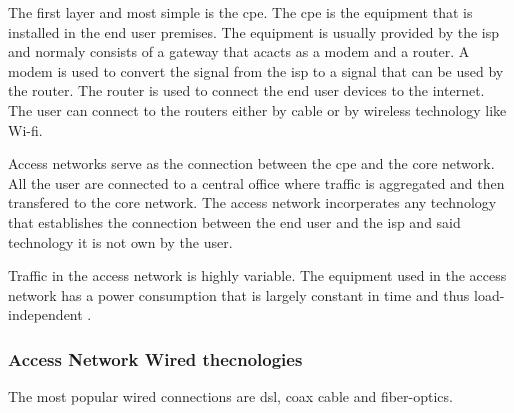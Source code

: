The first layer and most simple is the \ac{cpe}. The \ac{cpe} is the equipment that is installed in the end user premises. 
The equipment is usually provided by the \ac{isp} and normaly consists of a gateway that acacts as a modem and a router.
A modem is used to convert the signal from the \ac{isp} to a signal that can be used by the router. The router is used to connect the end user devices to the internet. The user can connect to the routers either by cable or by wireless technology like Wi-fi. 

Access networks serve as the connection between the \ac{cpe} and the core network. All the user are connected to a central office where traffic is aggregated and then transfered to the core network.
The access network incorperates any technology that establishes the connection between the end user and the \ac{isp} and said technology it is not own by the user. %

Traffic in the access network is highly variable. The equipment used in the access network has a power consumption that is largely constant in time and thus load-independent \citet{Heddeghem2011}.

\subsubsection{Access Network Wired thecnologies}

The most popular wired connections are \ac{dsl}, coax cable and fiber-optics.

